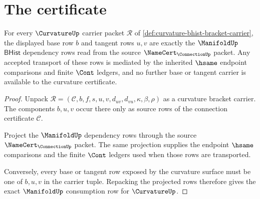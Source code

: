 \section{The certificate}
\label{sec:curvature-certificate}
\begin{theorem}
\label{thm:curvature-manifold-base-dependency-row}
For every $\CurvatureUp$ carrier packet $\mathcal{R}$ of \autoref{def:curvature-bhist-bracket-carrier}, the displayed base row $b$ and tangent rows $u,v$ are exactly the $\ManifoldUp$ $\mathsf{BHist}$ dependency rows read from the source $\NameCert_{\ConnectionUp}$ packet. Any accepted transport of these rows is mediated by the inherited $\hsame$ endpoint comparisons and finite $\Cont$ ledgers, and no further base or tangent carrier is available to the curvature certificate.
\end{theorem}
\begin{proof}
Unpack $\mathcal{R}=(\mathcal{C},b,f,s,u,v,d_{uv},d_{vu},\kappa,\beta,\rho)$ as a curvature bracket carrier. The components $b,u,v$ occur there only as source rows of the connection certificate $\mathcal{C}$.

Project the $\ManifoldUp$ dependency rows through the source $\NameCert_{\ConnectionUp}$ packet. The same projection supplies the endpoint $\hsame$ comparisons and the finite $\Cont$ ledgers used when those rows are transported.

Conversely, every base or tangent row exposed by the curvature surface must be one of $b,u,v$ in the carrier tuple. Repacking the projected rows therefore gives the exact $\ManifoldUp$ consumption row for $\CurvatureUp$.
\end{proof}

